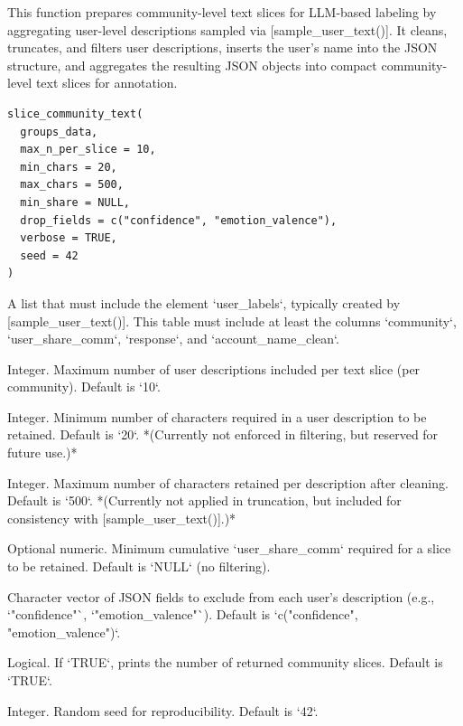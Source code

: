 \documentclass[a4paper]{book}
\begin{document}
%
\begin{Description}
This function prepares community-level text slices for LLM-based labeling by
aggregating user-level descriptions sampled via [sample\_user\_text()]. It cleans,
truncates, and filters user descriptions, inserts the user's name into the JSON
structure, and aggregates the resulting JSON objects into compact community-level
text slices for annotation.
\end{Description}
%
\begin{Usage}
\begin{verbatim}
slice_community_text(
  groups_data,
  max_n_per_slice = 10,
  min_chars = 20,
  max_chars = 500,
  min_share = NULL,
  drop_fields = c("confidence", "emotion_valence"),
  verbose = TRUE,
  seed = 42
)
\end{verbatim}
\end{Usage}
%
\begin{Arguments}
\begin{ldescription}
\item[\code{groups\_data}] A list that must include the element `user\_labels`, typically
created by [sample\_user\_text()]. This table must include at least the columns
`community`, `user\_share\_comm`, `response`, and `account\_name\_clean`.

\item[\code{max\_n\_per\_slice}] Integer. Maximum number of user descriptions included
per text slice (per community). Default is `10`.

\item[\code{min\_chars}] Integer. Minimum number of characters required in a user
description to be retained. Default is `20`. *(Currently not enforced in filtering,
but reserved for future use.)*

\item[\code{max\_chars}] Integer. Maximum number of characters retained per description
after cleaning. Default is `500`. *(Currently not applied in truncation, but included
for consistency with [sample\_user\_text()].)*

\item[\code{min\_share}] Optional numeric. Minimum cumulative `user\_share\_comm` required
for a slice to be retained. Default is `NULL` (no filtering).

\item[\code{drop\_fields}] Character vector of JSON fields to exclude from each user’s
description (e.g., `"confidence"`, `"emotion\_valence"`). Default is `c("confidence", "emotion\_valence")`.

\item[\code{verbose}] Logical. If `TRUE`, prints the number of returned community slices.
Default is `TRUE`.

\item[\code{seed}] Integer. Random seed for reproducibility. Default is `42`.
\end{ldescription}
\end{Arguments}
\end{document}
